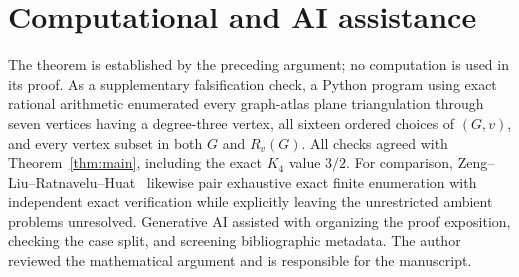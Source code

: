 \documentclass[11pt]{article}
\begin{document}
\section*{Computational and AI assistance}

The theorem is established by the preceding argument; no computation is
used in its proof.  As a supplementary falsification check, a Python program
using exact rational arithmetic enumerated every graph-atlas plane
triangulation through seven vertices having a degree-three vertex, all
sixteen ordered choices of \((G,v)\), and every vertex subset in both \(G\)
and \(R_v(G)\).  All checks agreed with Theorem~\ref{thm:main}, including the
exact \(K_4\) value \(3/2\).  For comparison,
Zeng--Liu--Ratnavelu--Huat~\cite{ZengEtAl2026Certificates} likewise pair
exhaustive exact finite enumeration with independent exact verification while
explicitly leaving the unrestricted ambient problems unresolved.  Generative AI
assisted with organizing the proof exposition, checking the case split, and
screening bibliographic metadata.  The author reviewed the mathematical
argument and is responsible for the manuscript.



\end{document}
